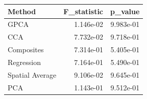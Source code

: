 \begin{tabular}{lrr}
\toprule
Method & F_statistic & p_value \\
\midrule
GPCA & 1.146e-02 & 9.983e-01 \\
CCA & 7.732e-02 & 9.718e-01 \\
Composites & 7.314e-01 & 5.405e-01 \\
Regression & 7.164e-01 & 5.490e-01 \\
Spatial Average & 9.106e-02 & 9.645e-01 \\
PCA & 1.143e-01 & 9.512e-01 \\
\bottomrule
\end{tabular}
